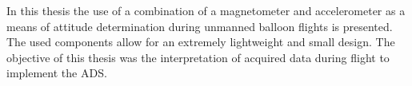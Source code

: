 In this thesis the use of a combination of a magnetometer and accelerometer as a means of attitude determination during unmanned balloon flights is presented. The used components allow for an extremely lightweight and small design. The objective of this thesis was the interpretation of acquired data during flight to implement the \acf{ADS}.